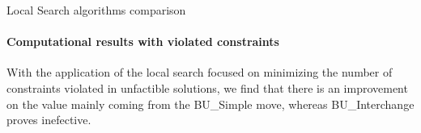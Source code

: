 \documentclass{beamer}
\begin{document}
\begin{frame}{Local Search algorithms comparison}
    \framesubtitle{Computational results with violated constraints}
    \begin{table}
        \centering
        \caption{Summary of the experiment results}
        \label{tab:ls_cons_exp}
    \end{table}
    With the application of the local search focused on minimizing the number of constraints violated in unfactible solutions, we find that there is an improvement on the value mainly coming from the BU\_Simple move, whereas BU\_Interchange proves inefective.
\end{frame}
\end{document}

